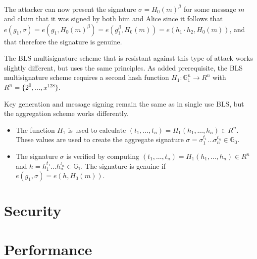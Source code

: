 The attacker can now present the signature $\sigma=H_0(m)^\beta$ for some message $m$ and claim that it was signed by both him and Alice since it follows that $e(g_1,\sigma)=e(g_1,H_0(m)^\beta)=e(g_1^\beta,H_0(m))=e(h_1\cdot h_2,H_0(m))$, and that therefore the signature is genuine.

The BLS multisignature scheme that is resistant against this type of attack works slightly different, but uses the same principles. As added prerequisite, the BLS multisignature scheme requires a second hash function $H_1:\mathbb{G}_1^n\to R^n$ with $R^n=\{2^0,\dots,x^128\}$.

Key generation and message signing remain the same as in single use BLS, but the aggregation scheme works differently.
\begin{itemize}
	\item The function $H_1$ is used to calculate $(t_1,\dots,t_n)=H_1(h_1,\dots,h_n)\in R^n$. These values are used to create the aggregate signature $\sigma=\sigma_1^{t_1}\dots\sigma_n^{t_n}\in\mathbb{G}_0$.
	\item The signature $\sigma$ is verified by computing $(t_1,\dots,t_n)=H_1(h_1,\dots,h_n)\in R^n$ and $h=h_1^{t_1}\dots h_n^{t_n}\in\mathbb{G}_1$. The signature is genuine if $e(g_1,\sigma)=e(h,H_0(m))$.
\end{itemize}
\section{Security}
\section{Performance}